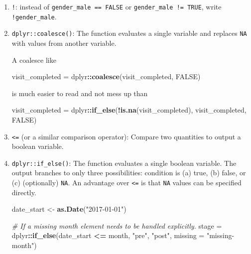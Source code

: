 \documentclass[
]{book}
\newenvironment{Shaded}{\begin{snugshade}}{\end{snugshade}}
\newcommand{\CommentTok}[1]{\textcolor[rgb]{0.56,0.35,0.01}{\textit{#1}}}
\newcommand{\DataTypeTok}[1]{\textcolor[rgb]{0.13,0.29,0.53}{#1}}
\newcommand{\KeywordTok}[1]{\textcolor[rgb]{0.13,0.29,0.53}{\textbf{#1}}}
\newcommand{\NormalTok}[1]{#1}
\newcommand{\OperatorTok}[1]{\textcolor[rgb]{0.81,0.36,0.00}{\textbf{#1}}}
\newcommand{\OtherTok}[1]{\textcolor[rgb]{0.56,0.35,0.01}{#1}}
\newcommand{\StringTok}[1]{\textcolor[rgb]{0.31,0.60,0.02}{#1}}
\begin{document}
\begin{enumerate}
\def\labelenumi{\arabic{enumi}.}
\item
  \texttt{!}: instead of \texttt{gender\_male\ ==\ FALSE} or \texttt{gender\_male\ !=\ TRUE}, write \texttt{!gender\_male}.
\item
  \texttt{dplyr::coalesce()}: The function evaluates a single variable and replaces \texttt{NA} with values from another variable.

  A coalesce like

\begin{Shaded}
\begin{Highlighting}[]
\NormalTok{visit\_completed =}\StringTok{ }\NormalTok{dplyr}\OperatorTok{::}\KeywordTok{coalesce}\NormalTok{(visit\_completed, }\OtherTok{FALSE}\NormalTok{)}
\end{Highlighting}
\end{Shaded}

  is much easier to read and not mess up than

\begin{Shaded}
\begin{Highlighting}[]
\NormalTok{visit\_completed =}\StringTok{ }\NormalTok{dplyr}\OperatorTok{::}\KeywordTok{if\_else}\NormalTok{(}\OperatorTok{!}\KeywordTok{is.na}\NormalTok{(visit\_completed), visit\_completed, }\OtherTok{FALSE}\NormalTok{)}
\end{Highlighting}
\end{Shaded}
\item
  \texttt{\textless{}=} (or a similar comparison operator): Compare two quantities to output a boolean variable.
\item
  \texttt{dplyr::if\_else()}: The function evaluates a single boolean variable. The output branches to only three possibilities: condition is (a) true, (b) false, or (c) (optionally) \texttt{NA}. An advantage over \texttt{\textless{}=} is that \texttt{NA} values can be specified directly.

\begin{Shaded}
\begin{Highlighting}[]
\NormalTok{date\_start <{-}}\StringTok{ }\KeywordTok{as.Date}\NormalTok{(}\StringTok{"2017{-}01{-}01"}\NormalTok{)}

\CommentTok{\# If a missing month element needs to be handled explicitly.}
\NormalTok{stage       =}\StringTok{ }\NormalTok{dplyr}\OperatorTok{::}\KeywordTok{if\_else}\NormalTok{(date\_start }\OperatorTok{<=}\StringTok{ }\NormalTok{month, }\StringTok{"pre"}\NormalTok{, }\StringTok{"post"}\NormalTok{, }\DataTypeTok{missing =} \StringTok{"missing{-}month"}\NormalTok{)}


\end{Highlighting}
\end{Shaded}
\end{enumerate}
\end{document}
